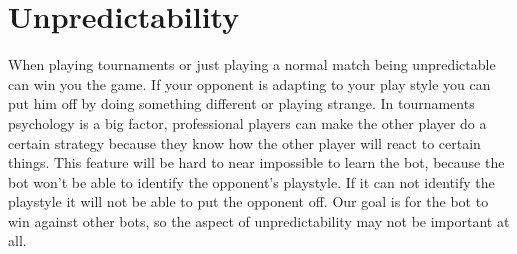 \section{Unpredictability}
	When playing tournaments or just playing a normal match being unpredictable can win you the game. 
	If your opponent is adapting to your play style you can put him off by doing something different or playing strange.
	In tournaments psychology is a big factor, professional players can make the other player do a certain strategy because they know 
	how the other player will react to certain things. This feature will be hard to near impossible to learn the bot, because the bot won't be able to 
	identify the opponent's playstyle. If it can not identify the playstyle it will not be able to put the opponent off. Our goal is for the bot 
	to win against other bots, so the aspect of unpredictability may not be important at all. 
